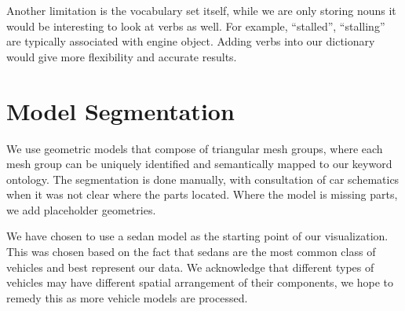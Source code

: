 Another limitation is the vocabulary set itself, while we are only storing nouns
it would be interesting to look at verbs as well. For example, ``stalled'',
``stalling'' are typically associated with engine object. Adding verbs into our
dictionary would give more flexibility and accurate results.


\section{Model Segmentation}
We use geometric models that compose of triangular mesh groups, where each mesh 
group can be uniquely identified and semantically mapped to our keyword ontology. 
The segmentation is done manually, with consultation of car schematics when it 
was not clear where the parts located. Where the model is missing parts, 
we add placeholder geometries.

We have chosen to use a sedan model as the starting point of our visualization. 
This was chosen based on the fact that sedans are the most common class of 
vehicles and best represent our data. We acknowledge that different types of 
vehicles may have different spatial arrangement of their components, we hope to 
remedy this as more vehicle models are processed.

